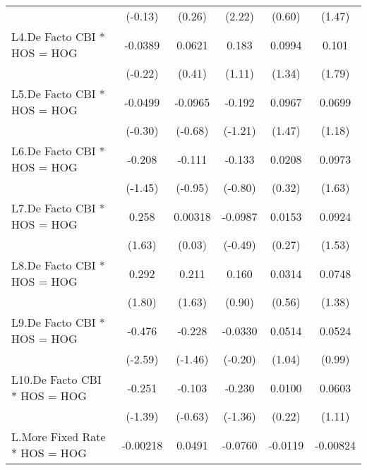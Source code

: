 {\begin{tabular}{l*{5}{c}}
                &  (-0.13)         &   (0.26)         &   (2.22)         &   (0.60)         &   (1.47)         \\
[1em]
L4.De Facto CBI * HOS = HOG&  -0.0389         &   0.0621         &    0.183         &   0.0994         &    0.101         \\
                &  (-0.22)         &   (0.41)         &   (1.11)         &   (1.34)         &   (1.79)         \\
[1em]
L5.De Facto CBI * HOS = HOG&  -0.0499         &  -0.0965         &   -0.192         &   0.0967         &   0.0699         \\
                &  (-0.30)         &  (-0.68)         &  (-1.21)         &   (1.47)         &   (1.18)         \\
[1em]
L6.De Facto CBI * HOS = HOG&   -0.208         &   -0.111         &   -0.133         &   0.0208         &   0.0973         \\
                &  (-1.45)         &  (-0.95)         &  (-0.80)         &   (0.32)         &   (1.63)         \\
[1em]
L7.De Facto CBI * HOS = HOG&    0.258         &  0.00318         &  -0.0987         &   0.0153         &   0.0924         \\
                &   (1.63)         &   (0.03)         &  (-0.49)         &   (0.27)         &   (1.53)         \\
[1em]
L8.De Facto CBI * HOS = HOG&    0.292         &    0.211         &    0.160         &   0.0314         &   0.0748         \\
                &   (1.80)         &   (1.63)         &   (0.90)         &   (0.56)         &   (1.38)         \\
[1em]
L9.De Facto CBI * HOS = HOG&   -0.476\sym{*}  &   -0.228         &  -0.0330         &   0.0514         &   0.0524         \\
                &  (-2.59)         &  (-1.46)         &  (-0.20)         &   (1.04)         &   (0.99)         \\
[1em]
L10.De Facto CBI * HOS = HOG&   -0.251         &   -0.103         &   -0.230         &   0.0100         &   0.0603         \\
                &  (-1.39)         &  (-0.63)         &  (-1.36)         &   (0.22)         &   (1.11)         \\
[1em]
L.More Fixed Rate * HOS = HOG& -0.00218         &   0.0491         &  -0.0760         &  -0.0119         & -0.00824         \\

\end{tabular}}
